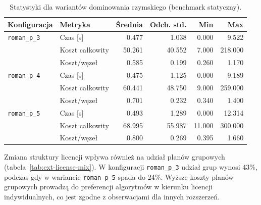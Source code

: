 \begin{table}[H]
    \centering
    \caption{Statystyki dla wariantów dominowania rzymskiego (benchmark statyczny).}
    \label{tab:ext-roman-stats}
    \begin{tabular}{llrrrr}
        \toprule
        \textbf{Konfiguracja} & \textbf{Metryka} & \textbf{Średnia} & \textbf{Odch. std.} & \textbf{Min} & \textbf{Max} \\
        \midrule
        \texttt{roman\_p\_3}  & Czas [s]         & 0.477            & 1.038               & 0.000        & 9.522        \\
                              & Koszt całkowity  & 50.261           & 40.552              & 7.000        & 218.000      \\
                              & Koszt/węzeł      & 0.585            & 0.199               & 0.260        & 1.170        \\
        \midrule
        \texttt{roman\_p\_4}  & Czas [s]         & 0.475            & 1.125               & 0.000        & 9.189        \\
                              & Koszt całkowity  & 60.441           & 48.750              & 9.000        & 259.000      \\
                              & Koszt/węzeł      & 0.701            & 0.232               & 0.340        & 1.400        \\
        \midrule
        \texttt{roman\_p\_5}  & Czas [s]         & 0.493            & 1.289               & 0.000        & 12.314       \\
                              & Koszt całkowity  & 68.995           & 55.987              & 11.000       & 300.000      \\
                              & Koszt/węzeł      & 0.800            & 0.269               & 0.395        & 1.660        \\
        \bottomrule
    \end{tabular}
\end{table}

Zmiana struktury licencji wpływa również na udział planów grupowych (tabela~\ref{tab:ext-license-mix}). W konfiguracji \texttt{roman\_p\_3} udział grup wynosi 43\%, podczas gdy w wariancie \texttt{roman\_p\_5} spada do 24\%. Wyższe koszty planów grupowych prowadzą do preferencji algorytmów w kierunku licencji indywidualnych, co jest zgodne z obserwacjami dla innych rozszerzeń.

